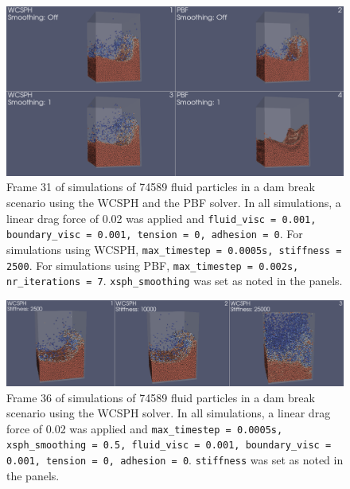 \documentclass[11pt, letterpaper, twocolumn]{article}
\begin{document}
\begin{figure}
  \centering
  \includegraphics[width=\textwidth]{images/smoothing.0031.png}
  \caption{Frame 31 of simulations of 74589 fluid particles in a dam break scenario using the WCSPH and the PBF solver. In all simulations, a linear drag force of 0.02 was applied and \texttt{fluid\_visc = 0.001, boundary\_visc = 0.001, tension = 0, adhesion = 0}. For simulations using WCSPH, \texttt{max\_timestep = 0.0005s,
  stiffness = 2500}. For simulations using PBF, \texttt{max\_timestep = 0.002s, nr\_iterations = 7}. \texttt{xsph\_smoothing} was set as noted in the panels.}
  \label{fig:dam_comparisons_smoothing}
\end{figure}

\begin{figure}
  \centering
  \includegraphics[width=\textwidth]{images/stiffness.0036.png}
  \caption{Frame 36 of simulations of 74589 fluid particles in a dam break scenario using the WCSPH solver. In all simulations, a linear drag force of 0.02 was applied and \texttt{max\_timestep = 0.0005s, xsph\_smoothing = 0.5, fluid\_visc = 0.001, boundary\_visc = 0.001, tension = 0, adhesion = 0}. \texttt{stiffness} was 
  set as noted in the panels.}
  \label{fig:dam_comparisons_stiffness}
\end{figure}
\end{document}
